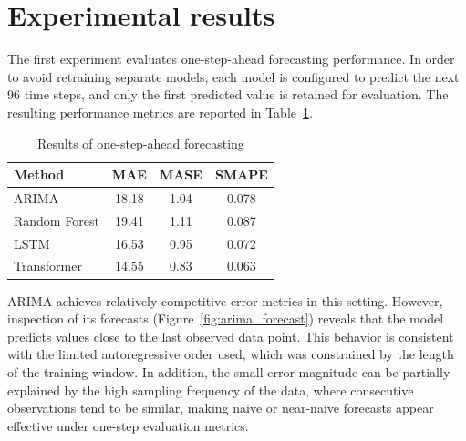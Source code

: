 

\section{Experimental results}

The first experiment evaluates one-step-ahead forecasting performance. In order to avoid retraining separate models, each model is configured to predict the next 96 time steps, and only the first predicted value is retained for evaluation. The resulting performance metrics are reported in Table~\ref{tab:1stepforecasting}.

\begin{table}[H]
    \centering
    \caption{Results of one-step-ahead forecasting}
    \label{tab:1stepforecasting}
    \setlength{\tabcolsep}{6pt}
    \renewcommand{\arraystretch}{1.1}
    \begin{tabular}{l|c|c|c}
    \hline
    Method & MAE & MASE & SMAPE \\
    \hline
    ARIMA & 18.18 & 1.04 & 0.078 \\
    Random Forest & 19.41 & 1.11 & 0.087 \\
    LSTM & 16.53 & 0.95 & 0.072 \\
    Transformer & 14.55 & 0.83 & 0.063 \\
    \hline
    \end{tabular}
\end{table}

\par
ARIMA achieves relatively competitive error metrics in this setting. However, inspection of its forecasts (Figure~\ref{fig:arima_forecast}) reveals that the model  predicts values close to the last observed data point. This behavior is consistent with the limited autoregressive order used, which was constrained by the length of the training window. In addition, the small error magnitude can be partially explained by the high sampling frequency of the data, where consecutive observations tend to be similar, making naive or near-naive forecasts appear effective under one-step evaluation metrics.

